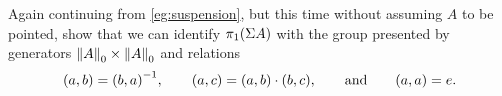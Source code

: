 \begin{ex}\label{ex:vksuspnopt}
  Again continuing from \cref{eg:suspension}, but this time without assuming $A$ to be pointed, show that we can identify $\pi_1(\susp A)$ with the group presented by generators $\trunc0A \times \trunc0A$ and relations
  \begin{equation*}
    (a,b) = \opp{(b,a)},
    \qquad
    (a,c) = (a,b)\cdot (b,c),
    \qquad\text{and}\qquad
    (a,a) = e.
  \end{equation*}
\end{ex}


